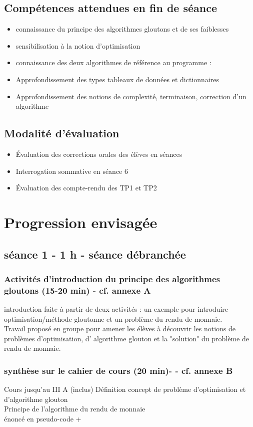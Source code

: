 \documentclass[12pt,french]{report}
\begin{document}
  \section{Compétences attendues en fin de séance}
  \begin{itemize}[$\bullet$]
  \item connaissance du principe des algorithmes gloutons et de ses faiblesses
  \item sensibilisation à la notion d'optimisation
  \item connaissance des deux algorithmes de référence au programme : 
   \item Approfondissement des types tableaux de données et dictionnaires
 \item Approfondissement des notions de complexité, terminaison, correction d'un algorithme
\end{itemize} 
\section{Modalité d'évaluation}
\begin{itemize}[$\bullet$]
	\item Évaluation des corrections orales des élèves en séances 
	\item Interrogation sommative en séance 6 
	\item Évaluation des compte-rendu des TP1 et TP2
\end{itemize} 
\chapter{Progression envisagée}
\section{séance 1 - 1 h - séance débranchée}
\subsection{Activités d'introduction du principe des algorithmes gloutons (15-20 min) - cf. annexe A}
introduction faite à partir de deux activités : un exemple pour introduire optimisation/méthode gloutonne et un problème du rendu de monnaie.\\
Travail proposé en groupe pour amener les élèves à découvrir les notions de problèmes d'optimisation, d' algorithme glouton et la "solution" du problème de rendu de monnaie.
\subsection{synthèse sur le cahier de cours (20 min)-  - cf. annexe B}
Cours jusqu'au III A (inclus)
Définition concept de problème d'optimisation et d'algorithme glouton\\
Principe de l'algorithme du rendu de monnaie\\
énoncé en pseudo-code +\\
\end{document}
